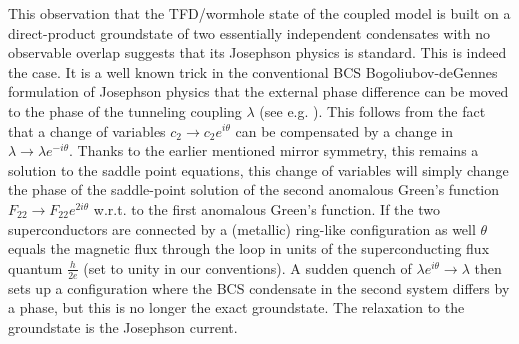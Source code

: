 This observation that the TFD/wormhole state of the coupled model is built on a direct-product groundstate of two essentially independent condensates with no observable overlap suggests that its Josephson physics is standard. This is indeed the case. It is a well known trick in the conventional BCS Bogoliubov-deGennes formulation of Josephson physics that the external phase difference can be moved to the phase of the tunneling coupling $\lambda$ (see e.g. \cite{tummuru2022josephson}). 
This follows from the fact that a change of variables $c_2\rightarrow c_2e^{i\theta}$ can be compensated by a change in $\lambda \rightarrow \lambda e^{-i\theta}$. Thanks to the earlier mentioned mirror symmetry, this remains a solution to the saddle point equations, this change of variables will simply change the phase of the saddle-point solution of the second anomalous Green's function $F_{22}\rightarrow F_{22}e^{2i\theta}$ w.r.t. to the first anomalous Green's function.  If the two superconductors are connected by a (metallic) ring-like configuration as well $\theta$ equals the magnetic flux through the loop in units of the superconducting flux quantum $\frac{h}{2e}$ (set to unity in our conventions). A sudden quench of $\lambda e^{i\theta} \rightarrow \lambda$ then sets up a configuration where the BCS condensate in the second system differs by a phase, but this is no longer the exact groundstate. The relaxation to the groundstate is the Josephson current. 

